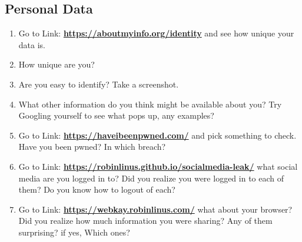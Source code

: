 \documentclass[12pt]{article}
\begin{document}
\subsection*{Personal Data}
    \begin{enumerate}
        \item Go to Link: \href{https://aboutmyinfo.org/identity}{\textbf{https://aboutmyinfo.org/identity}} and see how unique your data is.   
        \item How unique are you?
        \item Are you easy to identify? Take a screenshot.
        \item What other information do you think might be available about you? Try Googling yourself to see what pops up, any examples?
        \item Go to Link: \href{https://haveibeenpwned.com/}{\textbf{https://haveibeenpwned.com/}} and pick something to check.  Have you been pwned? In which breach?
        \item Go to Link: \href{https://robinlinus.github.io/socialmedia-leak/}{\textbf{https://robinlinus.github.io/socialmedia-leak/}} what social media are you logged in to? Did you realize you were logged in to each of them? Do you know how to logout of each?
        \item Go to Link: \href{https://webkay.robinlinus.com/}{\textbf{https://webkay.robinlinus.com/}} what about your browser? Did you realize how much information you were sharing? Any of them surprising? if yes, Which ones?
        
    \end{enumerate}
\end{document}
